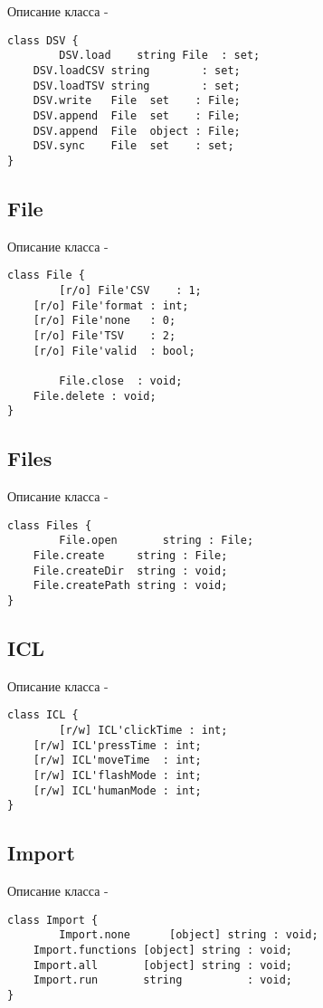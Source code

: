 \noindent Описание класса  -
\begin{lstlisting}[numbers=none]
class DSV {
        DSV.load    string File  : set;
	DSV.loadCSV string        : set;
	DSV.loadTSV string        : set;
	DSV.write   File  set    : File;
	DSV.append  File  set    : File;
	DSV.append  File  object : File;
	DSV.sync    File  set    : set;
}
\end{lstlisting}

\subsection{{\color{orange} File}}

\noindent Описание класса  -
\begin{lstlisting}[numbers=none]
class File {
        [r/o] File'CSV    : 1;
	[r/o] File'format : int;
	[r/o] File'none   : 0;
	[r/o] File'TSV    : 2;
	[r/o] File'valid  : bool;
	
        File.close  : void;
	File.delete : void;
}
\end{lstlisting}

\subsection{{\color{orange} Files}}

\noindent Описание класса  -
\begin{lstlisting}[numbers=none]
class Files {
        File.open       string : File;
	File.create     string : File;
	File.createDir  string : void;
	File.createPath string : void;
}
\end{lstlisting}

\subsection{{\color{orange} ICL}}

\noindent Описание класса  -
\begin{lstlisting}[numbers=none]
class ICL {
        [r/w] ICL'clickTime : int;
	[r/w] ICL'pressTime : int;
	[r/w] ICL'moveTime  : int;
	[r/w] ICL'flashMode : int;
	[r/w] ICL'humanMode : int;
}
\end{lstlisting}

\subsection{{\color{orange} Import}}

\noindent Описание класса  -
\begin{lstlisting}[numbers=none]
class Import {
        Import.none      [object] string : void;
	Import.functions [object] string : void;
	Import.all       [object] string : void;
	Import.run       string          : void;
}
\end{lstlisting}

